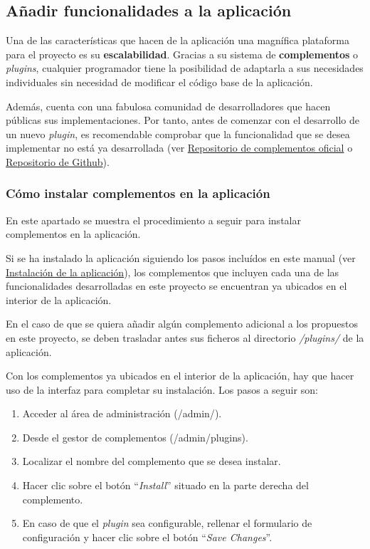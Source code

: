 \subsection{Añadir funcionalidades a la aplicación}

Una de las características que hacen de la aplicación una magnífica
plataforma para el proyecto es su \textbf{escalabilidad}. Gracias a su
sistema de \textbf{complementos} o \emph{plugins}, cualquier programador
tiene la posibilidad de adaptarla a sus necesidades individuales sin
necesidad de modificar el código base de la aplicación.

Además, cuenta con una fabulosa comunidad de desarrolladores que hacen
públicas sus implementaciones. Por tanto, antes de comenzar con el
desarrollo de un nuevo \emph{plugin}, es recomendable comprobar que la
funcionalidad que se desea implementar no está ya desarrollada (ver
\href{https://omeka.org/classic/plugins/}{Repositorio de complementos
oficial} o
\href{https://daniel-km.github.io/UpgradeToOmekaS/omeka_plugins.html}{Repositorio
de Github}).


\subsubsection{Cómo instalar complementos en la aplicación}

En este apartado se muestra el procedimiento a seguir para instalar
complementos en la aplicación.

Si se ha instalado la aplicación siguiendo los pasos incluídos en este
manual (ver
\protect\hyperlink{instalaciuxf3n-de-la-aplicaciuxf3n}{Instalación de la
aplicación}), los complementos que incluyen cada una de las
funcionalidades desarrolladas en este proyecto se encuentran ya ubicados
en el interior de la aplicación.

En el caso de que se quiera añadir algún complemento adicional a los
propuestos en este proyecto, se deben trasladar antes sus ficheros al
directorio \emph{/plugins/} de la aplicación.

Con los complementos ya ubicados en el interior de la aplicación, hay
que hacer uso de la interfaz para completar su instalación. Los pasos a
seguir son:

\begin{enumerate}
\def\labelenumi{\arabic{enumi}.}
\tightlist
\item
  Acceder al área de administración ({/admin/}).
\item
  Desde el gestor de complementos ({/admin/plugins}).
\item
  Localizar el nombre del complemento que se desea instalar.
\item
  Hacer clic sobre el botón ``\emph{Install}'' situado en la parte derecha
  del complemento.
\item
  En caso de que el \emph{plugin} sea configurable, rellenar el
  formulario de configuración y hacer clic sobre el botón ``\emph{Save
  Changes}''.
\end{enumerate}

